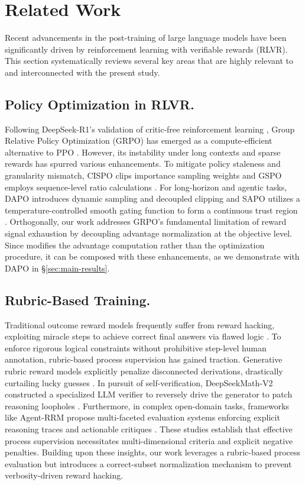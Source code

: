 \section{Related Work}
\label{sec:related}
Recent advancements in the post-training of large language models have been significantly driven by reinforcement learning with verifiable rewards (RLVR). This section systematically reviews several key areas that are highly relevant to and interconnected with the present study.
\subsection{Policy Optimization in RLVR.} 
Following DeepSeek-R1's validation of critic-free reinforcement learning \citep{guo2025deepseek}, Group Relative Policy Optimization (GRPO)\citep{shao2024deepseekmath} has emerged as a compute-efficient alternative to PPO \citep{schulman2017proximal}. However, its instability under long contexts and sparse rewards has spurred various enhancements. To mitigate policy staleness and granularity mismatch, CISPO clips importance sampling weights \citep{minimax2025minimaxm1scalingtesttimecompute} and GSPO employs sequence-level ratio calculations \citep{gspo}. For long-horizon and agentic tasks, DAPO introduces dynamic sampling and decoupled clipping \citep{Yu2025a} and  SAPO utilizes a temperature-controlled smooth gating function to form a continuous trust region \citep{SAPO2025}. Orthogonally, our work addresses GRPO's fundamental limitation of reward signal exhaustion by decoupling advantage normalization at the objective level. Since \method{} modifies the advantage computation rather than the optimization procedure, it can be composed with these enhancements, as we demonstrate with DAPO in \S\ref{sec:main-results}.


\subsection{Rubric-Based Training.}
Traditional outcome reward models frequently suffer from reward hacking, exploiting miracle steps to achieve correct final answers via flawed logic \citep{yuan2025miraclesteps}. To enforce rigorous logical constraints without prohibitive step-level human annotation, rubric-based process supervision has gained traction. Generative rubric reward models explicitly penalize disconnected derivations, drastically curtailing lucky guesses \citep{liang-etal-2025-generative}. In pursuit of self-verification, DeepSeekMath-V2 constructed a specialized LLM verifier to reversely drive the generator to patch reasoning loopholes \citep{deepseek-math-v2}. Furthermore, in complex open-domain tasks, frameworks like Agent-RRM propose multi-faceted evaluation systems enforcing explicit reasoning traces and actionable critiques \citep{fan2026exploring}. These studies establish that effective process supervision necessitates multi-dimensional criteria and explicit negative penalties. Building upon these insights, our work leverages a rubric-based process evaluation but introduces a correct-subset normalization mechanism to prevent verbosity-driven reward hacking.

